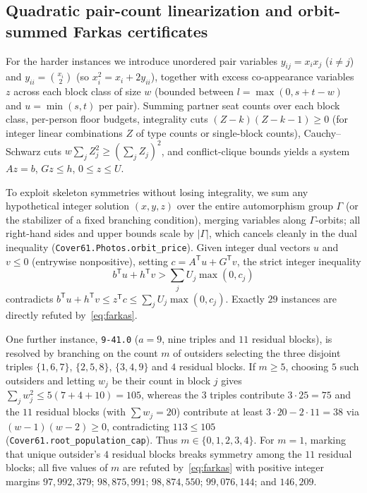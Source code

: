 \documentclass[11pt,a4paper]{article}
\theoremstyle{definition}
\theoremstyle{remark}
\begin{document}
\subsection{Quadratic pair-count linearization and orbit-summed Farkas certificates}

For the harder instances we introduce unordered pair variables $y_{ij} = x_i x_j$ ($i \ne j$) and $y_{ii} = \binom{x_i}{2}$ (so $x_i^2 = x_i + 2y_{ii}$), together with excess co-appearance variables $z$ across each block class of size $w$ (bounded between $l = \max(0, s+t-w)$ and $u = \min(s,t)$ per pair). Summing partner seat counts over each block class, per-person floor budgets, integrality cuts $(Z - k)(Z - k - 1) \ge 0$ (for integer linear combinations $Z$ of type counts or single-block counts), Cauchy--Schwarz cuts $w \sum_j Z_j^2 \ge (\sum_j Z_j)^2$, and conflict-clique bounds yields a system $Az = b$, $Gz \le h$, $0 \le z \le U$.

To exploit skeleton symmetries without losing integrality, we sum any hypothetical integer solution $(x, y, z)$ over the entire automorphism group $\Gamma$ (or the stabilizer of a fixed branching condition), merging variables along $\Gamma$-orbits; all right-hand sides and upper bounds scale by $|\Gamma|$, which cancels cleanly in the dual inequality (\texttt{Cover61.Photos.orbit\_price}). Given integer dual vectors $u$ and $v \le 0$ (entrywise nonpositive), setting $c = A^\mathsf{T} u + G^\mathsf{T} v$, the strict integer inequality
\begin{equation}\label{eq:farkas}
  b^\mathsf{T} u + h^\mathsf{T} v > \sum_j U_j \max(0, c_j)
\end{equation}
contradicts $b^\mathsf{T} u + h^\mathsf{T} v \le z^\mathsf{T} c \le \sum_j U_j \max(0, c_j)$. Exactly $29$ instances are directly refuted by~\eqref{eq:farkas}.

One further instance, \texttt{9-41.0} ($a=9$, nine triples and $11$ residual blocks), is resolved by branching on the count $m$ of outsiders selecting the three disjoint triples $\{1,6,7\}$, $\{2,5,8\}$, $\{3,4,9\}$ and $4$ residual blocks. If $m \ge 5$, choosing $5$ such outsiders and letting $w_j$ be their count in block $j$ gives $\sum_j w_j^2 \le 5(7 + 4 + 10) = 105$, whereas the $3$ triples contribute $3 \cdot 25 = 75$ and the $11$ residual blocks (with $\sum w_j = 20$) contribute at least $3 \cdot 20 - 2 \cdot 11 = 38$ via $(w-1)(w-2) \ge 0$, contradicting $113 \le 105$ (\texttt{Cover61.root\_population\_cap}). Thus $m \in \{0,1,2,3,4\}$. For $m=1$, marking that unique outsider's $4$ residual blocks breaks symmetry among the $11$ residual blocks; all five values of $m$ are refuted by~\eqref{eq:farkas} with positive integer margins $97{,}992{,}379$; $98{,}875{,}991$; $98{,}874{,}550$; $99{,}076{,}144$; and $146{,}209$.
\end{document}
